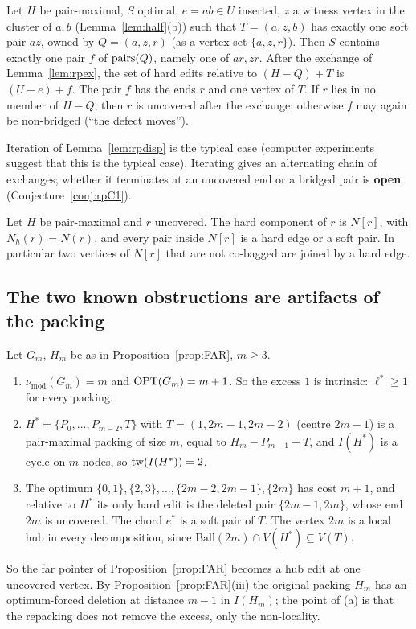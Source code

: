 \begin{lemma}\label{lem:rpdisp}
Let $H$ be pair-maximal, $S$ optimal, $e=ab\in U$ inserted, $z$ a witness vertex in the cluster of $a,b$ (Lemma~\ref{lem:half}(b)) such that $T=(a,z,b)$ has exactly one soft pair $az$, owned by $Q=(a,z,r)$ (as a vertex set $\{a,z,r\}$). Then $S$ contains exactly one pair $f$ of $\mathrm{pairs}(Q)$, namely one of $ar,zr$. After the exchange of Lemma~\ref{lem:rpex}, the set of hard edits relative to $(H-Q)+T$ is $(U-e)+f$. The pair $f$ has the ends $r$ and one vertex of $T$. If $r$ lies in no member of $H-Q$, then $r$ is uncovered after the exchange; otherwise $f$ may again be non-bridged (``the defect moves'').
\end{lemma}
Iteration of Lemma~\ref{lem:rpdisp} is the typical case (computer experiments suggest that this is the typical case). Iterating gives an alternating chain of exchanges; whether it terminates at an uncovered end or a bridged pair is \textbf{open} (Conjecture~\ref{conj:rpC1}).

\begin{lemma}\label{lem:rpout}
Let $H$ be pair-maximal and $r$ uncovered. The hard component of $r$ is $N[r]$, with $N_h(r)=N(r)$, and every pair inside $N[r]$ is a hard edge or a soft pair. In particular two vertices of $N[r]$ that are not co-bagged are joined by a hard edge.
\end{lemma}

\subsection{The two known obstructions are artifacts of the packing}
\begin{proposition}\label{prop:rpFAR}
Let $G_m$, $H_m$ be as in Proposition~\ref{prop:FAR}, $m\ge3$.
\begin{enumerate}
\item[(a)] $\nu_{\mathrm{mod}}(G_m)=m$ and $\mathrm{OPT}(G_m)=m+1$. So the excess $1$ is intrinsic: $\ell^*\ge1$ for every packing.
\item[(b)] $H^*=\{P_0,\dots,P_{m-2},T\}$ with $T=(1,2m-1,2m-2)$ (centre $2m-1$) is a pair-maximal packing of size $m$, equal to $H_m-P_{m-1}+T$, and $I(H^*)$ is a cycle on $m$ nodes, so $\mathrm{tw}(I(H^*))=2$.
\item[(c)] The optimum $\{0,1\},\{2,3\},\dots,\{2m-2,2m-1\},\{2m\}$ has cost $m+1$, and relative to $H^*$ its only hard edit is the deleted pair $\{2m-1,2m\}$, whose end $2m$ is uncovered. The chord $e^*$ is a soft pair of $T$. The vertex $2m$ is a local hub in every decomposition, since $\mathrm{Ball}(2m)\cap V(H^*)\subseteq V(T)$.
\end{enumerate}
\end{proposition}
So the far pointer of Proposition~\ref{prop:FAR} becomes a hub edit at one uncovered vertex. By Proposition~\ref{prop:FAR}(iii) the original packing $H_m$ has an optimum-forced deletion at distance $m-1$ in $I(H_m)$; the point of (a) is that the repacking does not remove the excess, only the non-locality.

